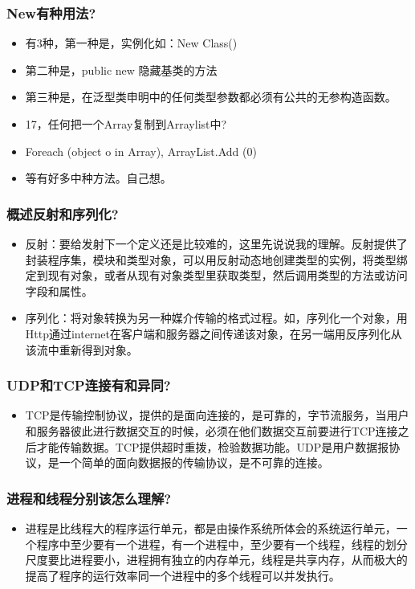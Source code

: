 \documentclass[9pt, b5paper]{article}
\begin{document}
\subsubsection{New有种用法?}
\label{sec-1-2-78}
\begin{itemize}
\item 有3种，第一种是，实例化如：New Class()
\item 第二种是，public new 隐藏基类的方法
\item 第三种是，在泛型类申明中的任何类型参数都必须有公共的无参构造函数。
\item 17，任何把一个Array复制到Arraylist中?
\item Foreach (object o in Array), ArrayList.Add (0)
\item 等有好多中种方法。自己想。
\end{itemize}
\subsubsection{概述反射和序列化?}
\label{sec-1-2-79}
\begin{itemize}
\item 反射：要给发射下一个定义还是比较难的，这里先说说我的理解。反射提供了封装程序集，模块和类型对象，可以用反射动态地创建类型的实例，将类型绑定到现有对象，或者从现有对象类型里获取类型，然后调用类型的方法或访问字段和属性。
\item 序列化：将对象转换为另一种媒介传输的格式过程。如，序列化一个对象，用Http通过internet在客户端和服务器之间传递该对象，在另一端用反序列化从该流中重新得到对象。
\end{itemize}
\subsubsection{UDP和TCP连接有和异同?}
\label{sec-1-2-80}
\begin{itemize}
\item TCP是传输控制协议，提供的是面向连接的，是可靠的，字节流服务，当用户和服务器彼此进行数据交互的时候，必须在他们数据交互前要进行TCP连接之后才能传输数据。TCP提供超时重拨，检验数据功能。UDP是用户数据报协议，是一个简单的面向数据报的传输协议，是不可靠的连接。
\end{itemize}
\subsubsection{进程和线程分别该怎么理解?}
\label{sec-1-2-81}
\begin{itemize}
\item 进程是比线程大的程序运行单元，都是由操作系统所体会的系统运行单元，一个程序中至少要有一个进程，有一个进程中，至少要有一个线程，线程的划分尺度要比进程要小，进程拥有独立的内存单元，线程是共享内存，从而极大的提高了程序的运行效率同一个进程中的多个线程可以并发执行。
\end{itemize}
\end{document}
